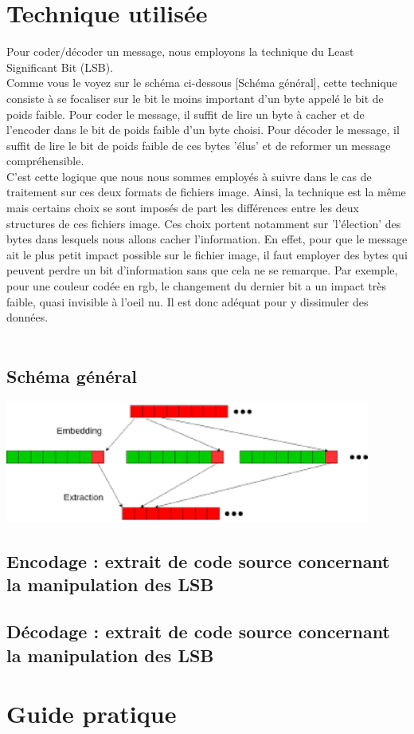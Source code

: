 \section{Technique utilisée}
Pour coder/décoder un message, nous employons la technique du Least Significant Bit (LSB). \\
Comme vous le voyez sur le schéma ci-dessous [Schéma général], cette technique consiste à se focaliser sur le bit le moins 
important d'un byte appelé le bit de poids faible.
Pour coder le message, il suffit de lire un byte à cacher et de l'encoder dans le bit de poids faible d'un byte choisi.
Pour décoder le message, il suffit de lire le bit de poids faible de ces bytes 'élus' et de reformer un message compréhensible.\\
C'est cette logique que nous nous sommes employés à suivre dans le cas de traitement sur ces deux formats de fichiers image.
Ainsi, la technique est la même mais certains choix se sont imposés de part les différences entre les deux structures de ces 
fichiers image. Ces choix portent notamment sur 'l'élection' des bytes dans lesquels nous allons cacher l'information.
En effet, pour que le message ait le plus petit impact possible sur le fichier image, il faut employer des bytes qui peuvent
perdre un bit d'information sans que cela ne se remarque.
Par exemple, pour une couleur codée en rgb, le changement du dernier bit a un impact très faible, quasi invisible à l'oeil nu.
Il est donc adéquat pour y dissimuler des données.\\\\

\subsection{Schéma général}
\includegraphics[width=12cm]{lsb.eps}

\subsection{Encodage : extrait de code source concernant la manipulation des LSB}


\subsection{Décodage : extrait de code source concernant la manipulation des LSB}


\vspace{1.5cm}

\section{Guide pratique}

